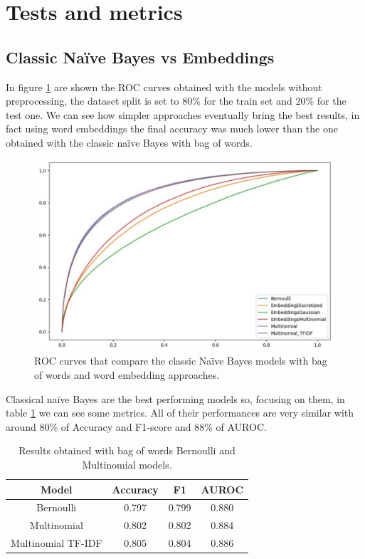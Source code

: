 \section*{Tests and metrics}

\subsection*{Classic Na\"ive Bayes vs Embeddings}

In figure \ref{fig:classic_nb_vs_embeddings} are shown the ROC curves obtained with the models without preprocessing, the dataset split is set to 80\% for the train set and 20\% for the test one.
We can see how simpler approaches eventually bring the best results, in fact using word embeddings the final accuracy was much lower than the one obtained with the classic na\"ive Bayes with bag of words. 

\begin{figure}[h!t]
    \centering
    \includegraphics[scale=0.30]{../experiments/plots/classic_nb_vs_embeddings}
    \caption{ROC curves that compare the classic Na\"ive Bayes models with bag of words and
    word embedding approaches.}
    \label{fig:classic_nb_vs_embeddings}        
\end{figure}

Classical na\"ive Bayes are the best performing models so, focusing on them, in table \ref{tab:classic_nb_vs_embeddings} we can see some metrics. 
All of their performances are very similar with around 80\% of Accuracy and F1-score and 88\% of AUROC.

\begin{table}[h!t]
    \centering
    \caption{Results obtained with bag of words Bernoulli and Multinomial models.}
    \label{tab:classic_nb_vs_embeddings}
    \begin{tabular}{c|ccc}
        \hline
        Model & Accuracy & F1 & AUROC \\
        \hline 
        Bernoulli & 0.797 & 0.799 & 0.880 \\ 
        Multinomial & 0.802 & 0.802 & 0.884 \\ 
        Multinomial TF-IDF & 0.805 & 0.804 & 0.886 \\ 
        \hline
    \end{tabular}
\end{table}

